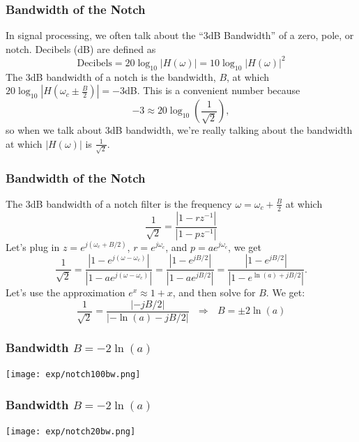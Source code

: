 \documentclass{beamer}
\begin{document}
\begin{frame}
  \frametitle{Bandwidth of the Notch}

  In signal processing, we often talk about the ``3dB Bandwidth'' of a
  zero, pole, or notch.  Decibels (dB)  are defined as
  \begin{displaymath}
    \mbox{Decibels} = 20\log_{10}|H(\omega)| = 10\log_{10}|H(\omega)|^2
  \end{displaymath}
  The 3dB bandwidth of a notch is the bandwidth, $B$, at which
  $20\log_{10}|H\left(\omega_c\pm \frac{B}{2}\right)|=-3$dB.  This is a convenient number because
  \begin{displaymath}
    -3 \approx 20\log_{10}\left(\frac{1}{\sqrt{2}}\right),
  \end{displaymath}
  so when we talk about 3dB bandwidth, we're really talking about the
  bandwidth at which $|H(\omega)|$ is $\frac{1}{\sqrt{2}}$.
\end{frame}

\begin{frame}
  \frametitle{Bandwidth of the Notch}

  The 3dB bandwidth of a notch filter is the frequency
  $\omega=\omega_c+\frac{B}{2}$ at which
  \begin{displaymath}
    \frac{1}{\sqrt{2}} = \frac{|1-rz^{-1}|}{|1-pz^{-1}|}
  \end{displaymath}
  Let's plug in $z=e^{j(\omega_c+B/2)}$, $r=e^{j\omega_c}$, and $p=ae^{j\omega_c}$, we get
  \begin{displaymath}
    \frac{1}{\sqrt{2}} = \frac{|1-e^{j(\omega-\omega_c)}|}{|1-ae^{j(\omega-\omega_c)}|}
    = \frac{|1-e^{jB/2}|}{|1-ae^{jB/2}|}
    = \frac{|1-e^{jB/2}|}{|1-e^{\ln(a)+jB/2}|}.
  \end{displaymath}
  Let's use the approximation $e^x\approx 1+x$, and then 
  solve for $B$.  We get:
  \begin{displaymath}
    \frac{1}{\sqrt{2}}=\frac{|-jB/2|}{|-\ln(a)-jB/2|}
    ~~~\Rightarrow~~~B = \pm 2\ln(a)
  \end{displaymath}
\end{frame}

\begin{frame}
  \frametitle{Bandwidth $B= -2\ln(a)$}

  \centerline{\texttt{[image: exp/notch100bw.png]}}
\end{frame}
\begin{frame}
  \frametitle{Bandwidth $B= -2\ln(a)$}

  \centerline{\texttt{[image: exp/notch20bw.png]}}
\end{frame}
\end{document}
